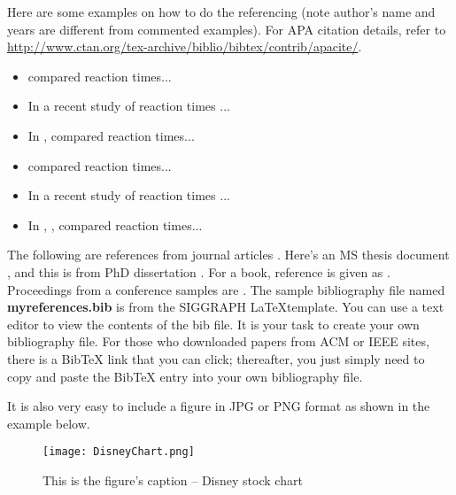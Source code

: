 Here are some examples on how to do the referencing (note author's name and years are different
from commented examples).  For APA citation details, refer
to \url{http://www.ctan.org/tex-archive/biblio/bibtex/contrib/apacite/}. 

\begin{itemize}
 \item {} compared reaction times...
 \item In a recent study of reaction times \cite{kartch:2000:ERA}...
 \item In , \citeauthor{kartch:2000:ERA} compared reaction times...
 \item {} compared reaction times... 
 \item In a recent study of reaction times \cite{fedkiw:2001:VSO}...
 \item In , , compared reaction times...
\end{itemize}

The following are references from journal articles \cite{Park:2006:DSI, Pellacini:2005:LAH, 
sako:2001:SSB}.  Here's an MS thesis document \cite{yee:2000:SSA}, and this is from
PhD dissertation \cite{kartch:2000:ERA}. For a book, reference is given as 
\cite{parke:1996:CFA}.  Proceedings from a conference samples are \cite{Jobs95, fedkiw:2001:VSO,
levoy:2000:TDM}.  The sample bibliography file named \textbf{myreferences.bib} is from the
SIGGRAPH \LaTeX template.  You can use a text editor to view the contents of the bib file.  
It is your task to create your own bibliography file.  For those who downloaded papers from
ACM or IEEE sites, there is a BibTeX link that you can click; thereafter, you just simply need
to copy and paste the BibTeX entry into your own bibliography file.

It is also very easy to include a figure in JPG or PNG format as shown in the 
example below.  


\begin{figure}[t]                %
   \centering                    %
   \texttt{[image: DisneyChart.png]}      %
   \caption{This is the figure's caption -- Disney stock chart}
    \label{fig:disneystock}
\end{figure}

